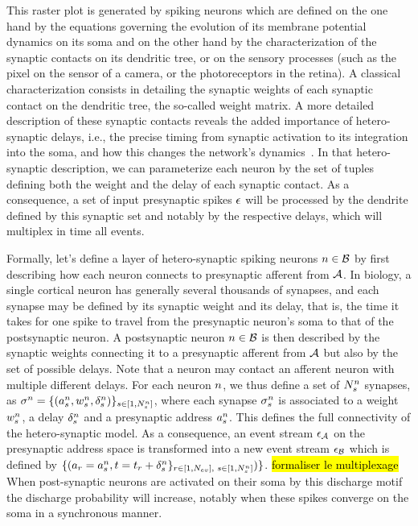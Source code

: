 \documentclass[default]{sn-jnl}%
\theoremstyle{thmstyleone}%
\theoremstyle{thmstyletwo}%
\theoremstyle{thmstylethree}%
\newcommand{\note}[1]{{\sethlcolor{yellow}\hl{#1}}}
\begin{document}
This raster plot is generated by spiking neurons which are defined on the one hand by the equations governing the evolution of its membrane potential dynamics on its soma and on the other hand by the characterization of the synaptic contacts on its dendritic tree, or on the sensory processes (such as the pixel on the sensor of a camera, or the photoreceptors in the retina). A classical characterization consists in detailing the synaptic weights of each synaptic contact on the dendritic tree, the so-called weight matrix. A more detailed description of these synaptic contacts reveals the added importance of hetero-synaptic delays, i.e., the precise timing from synaptic activation to its integration into the soma, and how this changes the network's dynamics~\citep{izhikevich_polychronization_2006}. In that hetero-synaptic description, we can parameterize each neuron by the set of tuples defining both the weight and the delay of each synaptic contact. As a consequence, a set of input presynaptic spikes $\epsilon$ will be processed by the dendrite defined by this synaptic set and notably by the respective delays, which will multiplex in time all events. 

Formally, let's define a layer of hetero-synaptic spiking neurons $n \in \mathcal{B}$ by first describing how each neuron connects to presynaptic afferent from $\mathcal{A}$. In biology, a single cortical neuron has generally several thousands of synapses, and each synapse may be defined by its synaptic weight and its delay, that is, the time it takes for one spike to travel from the presynaptic neuron's soma to that of the postsynaptic neuron. A postsynaptic neuron $n \in \mathcal{B}$ is then described by the synaptic weights connecting it to a presynaptic afferent from $\mathcal{A}$ but also by the set of possible delays. Note that a neuron may contact an afferent neuron with multiple different delays. For each neuron $n$, we thus define a set of $N_{s}^n$ synapses, as  $\sigma^n = \{(a^n_s, w^n_s, \delta^n_s)\}_{s \in [1,N_{s}^n]}$, where each synapse $\sigma^n_s$ is associated to a weight $w^n_s$, a delay $\delta^n_s$ and a presynaptic address $a^n_s$. This defines the full connectivity of the hetero-synaptic model. As a consequence, an event stream $\epsilon_{\mathcal{A}}$ on the presynaptic address space is transformed into a new event stream $\epsilon_{\mathcal{B}}$ which is defined by 
$\{ (a_r = 
 a_s^n, t=t_r + 
\delta_s^n \}_{ r \in [1,N_{ev}]\text{, }s \in [1,N_{s}^n]} )
\}$. \note{formaliser le multiplexage}
When post-synaptic neurons are activated on their soma by this discharge motif the discharge probability will increase, notably when these spikes converge on the soma in a synchronous manner. 
\end{document}
